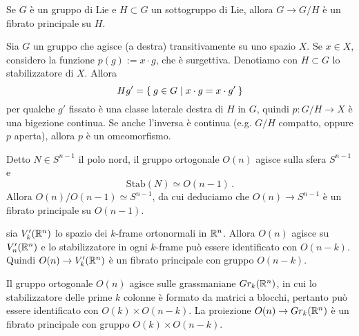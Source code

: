 \begin{ex}
	Se $G$ è un gruppo di Lie e $H \subset G$ un sottogruppo di Lie,
	allora $G \to G/H$ è un fibrato principale su $H$.
\end{ex}


Sia $G$ un gruppo che agisce (a destra) transitivamente su uno spazio $X$.
Se $x \in X$, considero la funzione $p(g) := x \cdot g$, che è surgettiva.
Denotiamo con $H \subset G$ lo stabilizzatore di $X$. Allora
\begin{equation*}
	Hg' = \Set{g \in G | x \cdot g = x \cdot g'}
\end{equation*}
per qualche $g'$ fissato è una classe laterale destra di $H$ in $G$,
quindi $p:G/H \to X$ è una bigezione continua.
Se anche l'inversa è continua (e.g. $G/H$ compatto, oppure $p$ aperta),
allora $p$ è un omeomorfismo.

\begin{ex}
	Detto $N \in S^{n-1}$ il polo nord, il gruppo ortogonale $O(n)$ agisce sulla sfera $S^{n-1}$ e
	\begin{equation*}
	 	\mathrm{Stab}(N) \simeq O(n-1)\,.
	 \end{equation*} 
	 Allora $O(n)/O(n-1) \simeq S^{n-1}$, da cui deduciamo che $O(n) \to S^{n-1}$
	 è un fibrato principale su $O(n-1)$.
\end{ex}

\begin{ex}
	sia $V_{k}'({\mathbb R}^{n})$ lo spazio dei $k$-frame ortonormali in ${\mathbb R}^{n}$.
	Allora $O(n)$ agisce su $V_{n}'({\mathbb R}^{n})$ e lo stabilizzatore in ogni $k$-frame
	può essere identificato con $O(n-k)$. Quindi $O(n) \to V_{k}'({\mathbb R}^{n})$ è un
	fibrato principale con gruppo $O(n-k)$.
\end{ex}

\begin{ex}
	Il gruppo ortogonale $O(n)$ agisce sulle grassmaniane $Gr_{k}({\mathbb R}^{n})$,
	in cui lo stabilizzatore delle prime $k$ colonne è formato da matrici a blocchi,
	pertanto può essere identificato con $O(k) \times O(n-k)$.
	La proiezione $O(n) \to Gr_{k}({\mathbb R}^{n})$ è un fibrato principale con gruppo
	$O(k) \times O(n-k)$.
\end{ex}

%		
%		


